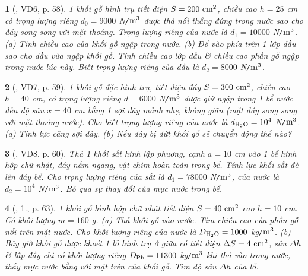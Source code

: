 \documentclass{article}
\newtheorem{baitoan}{}
\begin{document}
\begin{baitoan}[\cite{Van_Quyen_Hanh_Nhu_10_chuyen_Ly}, VD6, p. 58]
	1 khối gỗ hình trụ tiết diện $S = 200\ {\rm cm^2}$, chiều cao $h = 25$ {\rm cm} có trọng lượng riêng $d_0 = 9000$ {\rm N{\tt/}$\rm m^3$} được thả nổi thẳng đứng trong nước sao cho đáy song song với mặt thoáng. Trọng lượng riêng của nước là $d_1 = 10000$ {\rm N{\tt/}$\rm m^3$}. (a) Tính chiều cao của khối gỗ ngập trong nước. (b) Đổ vào phía trên 1 lớp dầu sao cho dầu vừa ngập khối gỗ. Tính chiều cao lớp dầu \& chiều cao phần gỗ ngập trong nước lúc này. Biết trọng lượng riêng của dầu là $d_2 = 8000$ {\rm N{\tt/}$\rm m^3$}.
\end{baitoan}

\begin{baitoan}[\cite{Van_Quyen_Hanh_Nhu_10_chuyen_Ly}, VD7, p. 59]
	1 khối gỗ đặc hình trụ, tiết diện đáy $S = 300\ {\rm cm^2}$, chiều cao $h = 40$ {\rm cm}, có trọng lượng riêng $d = 6000$ {\rm N{\tt/}$\rm m^3$} được giữ ngập trong 1 bể nước đến độ sâu $x = 40$ {\rm cm} bằng 1 sợi dây mảnh nhẹ, không giãn (mặt đáy song song với mặt thoáng nước). Cho biết trọng lượng riêng của nước là $d_{\rm H_2O} = 10^4$ {\rm N{\tt/}$\rm m^3$}. (a) Tính lực căng sợi dây. (b) Nếu dây bị đứt khối gỗ sẽ chuyển động thế nào?
\end{baitoan}

\begin{baitoan}[\cite{Van_Quyen_Hanh_Nhu_10_chuyen_Ly}, VD8, p. 60]
	Thả 1 khối sắt hình lập phương, cạnh $a = 10$ {\rm cm} vào 1 bể hình hộp chữ nhật, đáy nằm ngang, vật chìm hoàn toàn trong bể. Tính lực khối sắt đè lên đáy bể. Cho trọng lượng riêng của sắt là $d_1 = 78000$ {\rm N{\tt/}$\rm m^3$}, của nước là $d_2 = 10^4$ {\rm N{\tt/}$\rm m^3$}. Bỏ qua sự thay đổi của mực nước trong bể.
\end{baitoan}

\begin{baitoan}[\cite{Van_Quyen_Hanh_Nhu_10_chuyen_Ly}, 1., p. 63]
	1 khối gỗ hình hộp chữ nhật tiết diện $S = 40\ {\rm cm}^2$ cao $h = 10$ {\rm cm}. Có khối lượng $m = 160$ {\rm g}. (a) Thả khối gỗ vào nước. Tìm chiều cao của phần gỗ nổi trên mặt nước. Cho khối lượng riêng của nước là $D_{\rm H_2O} = 1000$ {\rm kg{\tt/}$\rm m^3$}. (b) Bây giờ khối gỗ được khoét 1 lỗ hình trụ ở giữa có tiết diện $\Delta S = 4\ {\rm cm}^2$, sâu $\Delta h$ \& lấp đầy chì có khối lượng riêng $D_{\rm Pb} = 11300$ {\rm kg{\tt/}$\rm m^3$} khi thả vào trong nước, thấy mực nước bằng với mặt trên của khối gỗ. Tìm độ sâu $\Delta h$ của lỗ.
\end{baitoan}
\end{document}
